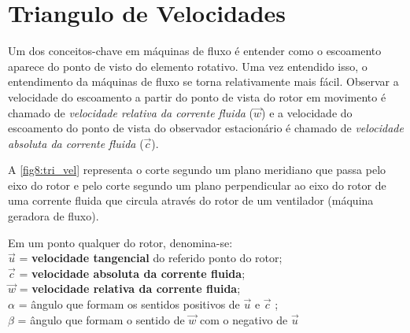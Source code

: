 \section{Triangulo de Velocidades}

    Um dos conceitos-chave em máquinas de fluxo é entender como o escoamento aparece do ponto de visto do elemento rotativo. Uma vez entendido isso, o entendimento da máquinas de fluxo se torna relativamente mais fácil. Observar a velocidade do escoamento a partir do ponto de vista do rotor em movimento é chamado de \textit{velocidade relativa da corrente fluida} ($\vec{w}$) e a velocidade do escoamento do ponto de vista do observador estacionário é chamado de \textit{velocidade absoluta da corrente fluida} ($\vec{c}$).


    A \autoref{fig8:tri_vel} representa o corte segundo um plano meridiano que passa pelo eixo do rotor e pelo corte segundo um plano perpendicular ao eixo do rotor de uma corrente fluida que circula através do rotor de um ventilador (máquina geradora de fluxo).

    \noindent
    Em um ponto qualquer do rotor, denomina-se: \\
        $\vec{u}$ = \textbf{velocidade tangencial} do referido ponto do rotor; \\
        $\vec{c}$ = \textbf{velocidade absoluta da corrente fluida}; \\
        $\vec{w}$ = \textbf{velocidade relativa da corrente fluida}; \\
        $\alpha$ = ângulo que formam os sentidos positivos de $\vec{u}$ e $\vec{c}$ ; \\
        $\beta$ = ângulo que formam o sentido de $\vec{w}$ com o negativo de $\vec{u}$

